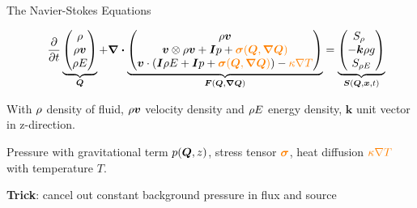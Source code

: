 \documentclass[aspectratio=169]{beamer}
\begin{document}
\begin{frame}{The Navier-Stokes Equations}
\newcommand{\diffCoeff}{\varepsilon}%
\newcommand{\hyperFluxDef}{
  \begin{pmatrix}
    \Qj \\
    \Qv  \otimes \Qj + \bm{I} \pressure  \\
    \Qv \cdot (\bm{I} \QE + \bm{I} \pressure)
  \end{pmatrix}
}%
\newcommand{\viscFluxDef}{
  \begin{pmatrix}
    0\\
     \stressT (\Q, \gradQ)  \\
     \Qv \cdot \stressT (\Q, \gradQ) - \kappa \gradient{T}
   \end{pmatrix}
}%

  \begin{equation}
 \label{eq:equation-set} 
\quad
  \pdv{}{t}
  \underbrace{
  \begin{pmatrix}
    \Qrho\\
    \Qj\\
    \QE
    \end{pmatrix}}_{\Q}
  +
  \divergence{\underbrace{
  \begin{pmatrix}
    \Qj \\
    \Qv  \otimes \Qj + \bm{I} \pressure + \textcolor{orange}{\stressT (\Q, \gradQ)}  \\
    \Qv \cdot \left(\bm{I} \QE + \bm{I} \pressure + \textcolor{orange}{\stressT (\Q, \gradQ)} \right) -
    \textcolor{orange}{\kappa \nabla T}
  \end{pmatrix}}}_{\flux(\Q, \gradQ)}
 =
  \underbrace{
  \begin{pmatrix}
    \source[\Qrho\phantom{\Qrho}]\\
    - \bm{k} \Qrho g\\
    \source[\QE]
    \end{pmatrix}}_{\source(\Q, \bm{x}, t)}
\end{equation}

With $\rho$ density of fluid, $\rho \bm{v}$ velocity density and $\rho E$ energy density, $\bm{k}$ unit vector in z-direction.

Pressure with gravitational term $p(\bm{Q}, z)$,
stress tensor $\textcolor{orange}{\bm{\sigma}}$, heat diffusion $\textcolor{orange}{\kappa \nabla T}$ with temperature $T$.

\textbf{Trick}: cancel out constant background pressure in flux and source

\end{frame}
\end{document}
